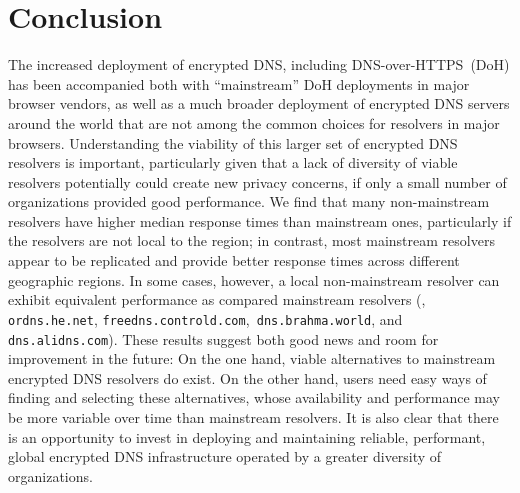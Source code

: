 \section{Conclusion}\label{sec:conclusion}

The increased deployment of encrypted DNS, including DNS-over-HTTPS~(DoH) has
been accompanied both with ``mainstream'' DoH deployments in major browser
vendors, as well as a much broader deployment of encrypted DNS servers around
the world that are not among the common choices for resolvers in major
browsers.  Understanding the viability of this larger set of encrypted DNS
resolvers is important, particularly given that a lack of diversity of viable
resolvers potentially could create new privacy concerns, if only a small
number of organizations provided good performance. We find that many
non-mainstream resolvers have higher median response times than mainstream
ones, particularly if the resolvers are not local to the region; in contrast,
most mainstream resolvers appear to be replicated and provide better response
times across different geographic regions. In some cases, however, a
local non-mainstream resolver can exhibit equivalent performance as compared
mainstream resolvers (\eg, {\tt ordns.he.net}, {\tt freedns.controld.com},{\tt
dns.brahma.world}, and {\tt dns.alidns.com}). These results
suggest both good news and room for improvement in the future: On the one
hand, viable alternatives to mainstream encrypted DNS resolvers do exist.  On
the other hand, users need easy ways of finding and selecting these
alternatives, whose availability and performance may be more variable over
time than mainstream resolvers. It is also clear that there is an opportunity
to invest in deploying and maintaining reliable, performant, global encrypted
DNS infrastructure operated by a greater diversity of organizations.

